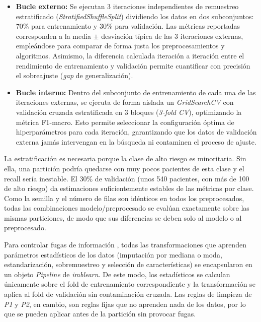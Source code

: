 \documentclass[journal,onecolumn]{IEEEtran}
\begin{document}
\begin{itemize}
    \item \textbf{Bucle externo:} Se ejecutan 3 iteraciones independientes de remuestreo estratificado (\textit{StratifiedShuffleSplit}) dividiendo los datos en dos subconjuntos: 70\% para entrenamiento y 30\% para validación. Las métricas reportadas corresponden a la media $\pm$ desviación típica de las 3 iteraciones externas, empleándose para comparar de forma justa los preprocesamientos y algoritmos. Asimismo, la diferencia calculada iteración a iteración entre el rendimiento de entrenamiento y validación permite cuantificar con precisión el sobreajuste (\textit{gap} de generalización).
    
    \item \textbf{Bucle interno:}  Dentro del subconjunto de entrenamiento de cada una de las iteraciones externas, se ejecuta de forma aislada un \textit{GridSearchCV} \cite{pedregosa2011sklearn} con validación cruzada estratificada en 3 bloques (\textit{3-fold CV}), optimizando la métrica F1-macro. Esto permite seleccionar la configuración óptima de hiperparámetros para cada iteración, garantizando que los datos de validación externa jamás intervengan en la búsqueda ni contaminen el proceso de ajuste.
\end{itemize}

La estratificación es necesaria porque la clase de alto riesgo es minoritaria. Sin ella, una partición podría quedarse con muy pocos pacientes de esta clase y el recall sería inestable. El 30\% de validación (unos 540 pacientes, con más de 100 de alto riesgo) da estimaciones suficientemente estables de las métricas por clase. Como la semilla y el número de filas son idénticos en todos los preprocesados, todas las combinaciones modelo/preprocesado se evalúan exactamente sobre las mismas particiones, de modo que sus diferencias se deben solo al modelo o al preprocesado.

Para controlar fugas de información \cite{kaufman2012leakage}, todas las transformaciones que aprenden parámetros estadísticos de los datos (imputación por mediana o moda, estandarización, sobremuestreo y selección de características) se encapsularon en un objeto \textit{Pipeline} de \textit{imblearn}. De este modo, los estadísticos se calculan únicamente sobre el fold de entrenamiento correspondiente y la transformación se aplica al fold de validación sin contaminación cruzada. Las reglas de limpieza de \textit{P1} y \textit{P2}, en cambio, son reglas fijas que no aprenden nada de los datos, por lo que se pueden aplicar antes de la partición sin provocar fugas.
\end{document}
